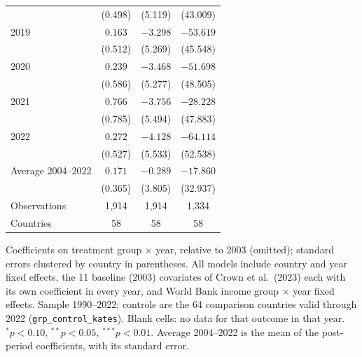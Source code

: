 \begin{table}[htbp]
{\begin{tabular}{lccc}
 & (0.498) & (5.119) & (43.009) \\
2019 & $0.163$ & $-3.298$ & $-53.619$ \\
 & (0.512) & (5.269) & (45.548) \\
2020 & $0.239$ & $-3.468$ & $-51.698$ \\
 & (0.586) & (5.277) & (48.505) \\
2021 & $0.766$ & $-3.756$ & $-28.228$ \\
 & (0.785) & (5.494) & (47.883) \\
2022 & $0.272$ & $-4.128$ & $-64.114$ \\
 & (0.527) & (5.533) & (52.538) \\
\midrule
Average 2004--2022 & $0.171$ & $-0.289$ & $-17.860$ \\
 & (0.365) & (3.805) & (32.937) \\
Observations & 1,914 & 1,914 & 1,334 \\
Countries & 58 & 58 & 58 \\
\bottomrule
\end{tabular}}
\par\vspace{4pt}
\begin{minipage}{\textwidth}\footnotesize Coefficients on treatment group $\times$ year, relative to 2003 (omitted); standard errors clustered by country in parentheses. All models include country and year fixed effects, the 11 baseline (2003) covariates of Crown et al.\ (2023) each with its own coefficient in every year, and World Bank income group $\times$ year fixed effects. Sample 1990--2022; controls are the 64 comparison countries valid through 2022 (\texttt{grp\_control\_kates}). Blank cells: no data for that outcome in that year. $^{*}p<0.10$, $^{**}p<0.05$, $^{***}p<0.01$. Average 2004--2022 is the mean of the post-period coefficients, with its standard error.\end{minipage}
\end{table}

